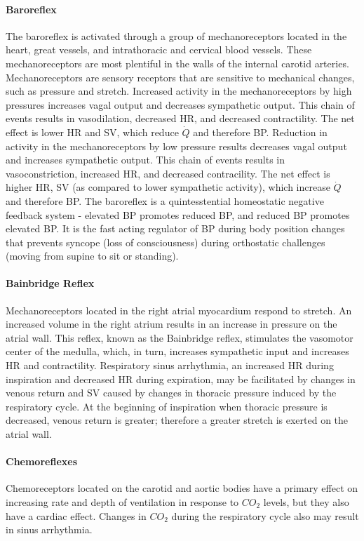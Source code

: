 \paragraph{Baroreflex}

The baroreflex is activated through a group of mechanoreceptors located in the heart, great vessels, and intrathoracic and cervical blood vessels. These mechanoreceptors are most plentiful in the walls of the internal carotid arteries. Mechanoreceptors are sensory receptors that are sensitive to mechanical changes, such as pressure and stretch. Increased activity in the mechanoreceptors by high pressures increases vagal output and decreases sympathetic output. This chain of events results in vasodilation, decreased HR, and decreased contractility. The net effect is lower HR and SV, which reduce $\dot{Q}$ and therefore BP. Reduction in activity in the mechanoreceptors by low pressure results decreases vagal output and increases sympathetic output. This chain of events results in vasoconstriction, increased HR, and decreased contracility. The net effect is higher HR,  SV (as compared to lower sympathetic activity), which increase $\dot{Q}$ and therefore BP. The baroreflex is a quintesstential homeostatic negative feedback system - elevated BP promotes reduced BP, and reduced BP promotes elevated BP. It is the fast acting regulator of BP during body position changes that prevents syncope (loss of consciousness) during orthostatic challenges  (moving from supine to sit or standing).


\paragraph{Bainbridge Reflex}

Mechanoreceptors located in the right atrial myocardium respond to stretch. An increased volume in the right atrium results in an increase in pressure on the atrial wall. This reflex, known as the Bainbridge reflex, stimulates the vasomotor center of the medulla, which, in turn, increases sympathetic input and increases HR and contractility. Respiratory sinus arrhythmia, an increased HR during inspiration and decreased HR during expiration, may be facilitated by changes in venous return and SV caused by changes in thoracic pressure induced by the respiratory cycle. At the beginning of inspiration when thoracic pressure is decreased, venous return is greater; therefore a greater stretch is exerted on the atrial wall.

\paragraph{Chemoreflexes}
Chemoreceptors located on the carotid and aortic bodies have a primary effect on increasing rate and depth of ventilation in response to $CO_2$ levels, but they also have a cardiac effect. Changes in $CO_2$ during the respiratory cycle also may result in sinus arrhythmia.

